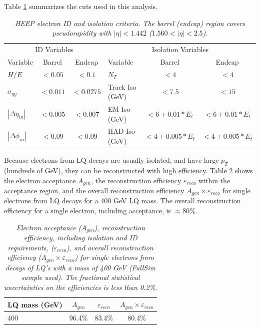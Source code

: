 \documentclass{cmspaper}
\begin{document}
\begin{linenumbers}
Table \ref{tab:HEEPselection} 
summarizes the cuts  
used in this analysis. 

\begin{table}[htbp]
  \label{tab:HEEPselection}
  \begin{center}
    \begin{tabular}{|lcc|lcc|} \hline
      \multicolumn{3}{|c|}{ID Variables} & \multicolumn{3}{|c|}{Isolation Variables} \\ 
      Variable & Barrel & Endcap & Variable & Barrel & Endcap  \\ \hline
      $H/E$  & $<0.05$ & $<0.1$ & $N_T$  & $<4$ & $<4$ \\ \hline
      $\sigma_{\eta\eta}$  & $<0.011$ & $<0.0275$ & Track Iso (GeV) & $<7.5$ & $<15$ \\ \hline
      $|\Delta\eta_{in}|$  & $<0.005$ & $<0.007$ & EM Iso (GeV) & $<6+0.01*E_{t}$ & $<6+0.01*E_{t}$ \\ \hline
      $|\Delta\phi_{in}|$  & $<0.09$ & $<0.09$ & HAD Iso (GeV) & $<4+0.005*E_{t}$ & $<4+0.005*E_{t}$ \\ \hline
    \end{tabular}
  \caption{\small \sl HEEP electron ID and isolation criteria.  The 
    barrel (endcap) region covers pseudorapidity with  
$|\eta|<1.442$ ($1.560<|\eta|<2.5$).}
  \end{center}
\end{table}

Because electrons from LQ decays are usually isolated, and have 
large $p_{T}$  
(hundreds of GeV), they can be reconstructed with high efficiency. 
Table \ref{tab:ElecEffAcc} 
shows the electron acceptance $A_{gen}$,
the reconstruction efficiency $\varepsilon_{reco}$ within the acceptance 
region, and the overall reconstruction efficiency $A_{gen} \times \varepsilon_{reco}$ 
for single electrons from LQ decays for a 400 GeV LQ mass.
The overall reconstruction efficiency for a single electron, including acceptance, is $\approx 80\%$.
\begin{table}[htb]
  \label{tab:ElecEffAcc}
  \begin{center}
    \begin{tabular}{|l|c|c|c|} \hline
      LQ mass (GeV) & $A_{gen}$ & $\varepsilon_{reco}$ & $A_{gen} \times \varepsilon_{reco}$\\ \hline
      400 & 96.4\% & 83.4\% & 80.4\% \\ \hline
    \end{tabular}
    \caption{\small \sl Electron acceptance ($A_{gen}$), 
      reconstruction efficiency, including isolation and ID requirements, 
($\varepsilon_{reco}$), and overall reconstruction efficiency 
      ($A_{gen} \times \varepsilon_{reco}$) for single electrons from decays 
of LQ's with a mass of 400 GeV (FullSim sample used).   
      The fractional statistical uncertainties on the efficiencies is 
less than 0.2\%.  
      } 
  \end{center}
\end{table}


\end{linenumbers}
\end{document}
